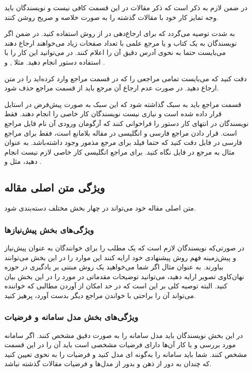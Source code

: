 \documentclass{CCI2020}
\begin{document}
در ضمن لازم به ذکر است که ذکر مقالات در این قسمت کافی نیست و نویسندگان باید وجه تمایز کار خود با مقالات گذشته را به صورت خلاصه و صریح روشن کنند. 

به شدت توصیه می‌گردد که برای ارجاع‌دهی در 
\lr{\LaTeX} 
از روش
استفاده کنید. در ضمن اگر نویسندگان به یک کتاب و یا مرجع علمی با تعداد صفحات زیاد می‌خواهند ارجاع دهند می‌بایست حتما به نحوی آدرس دقیق آن را اعلام کنند. در
\lr{\LaTeX}
می‌توانید این کار را با استفاده دستور
انجام دهید. مثلا
\cite[قضیه 2-1]{cover2006elements}, \cite[بخش ۳-۳]{Boyd2004Convex} و \cite[صفحه ۴۵]{Durrett2012Essentials}.

دقت کنید که می‌بایست تمامی مراجعی را که در قسمت مراجع وارد کرده‌اید را در متن ارجاع دهید. در صورت عدم ارجاع آن مرجع باید از قسمت مراجع حذف شود. 

قسمت مراجع باید به سبک
 گذاشته شود که این سبک به صورت پیش‌فرض در استایل قرار داده شده است و نیازی نیست نویسندگان کار خاصی را انجام دهند. فقط نویسندگان در انتهای کار دستور 
  را فراخوانی کنند که آرگومان ورودی آن نام فایل 
   مراجع است. قرار دادن مراجع فارسی و انگلیسی در مقاله بلامانع است، فقط برای مراجع فارسی در فایل
     دقت کنید که حتما فیلد 
     برای مرجع مذمور وجود داشته‌باشد. به عنوان مثال به مرجع
\cite{diyanat1389}
در فایل 
نگاه کنید. برای مراجع انگلیسی کار خاصی لازم نیست انجام دهید، مثل
\cite{Yang2010Modeling} و \cite{Beran1995Long}.



\subsection{ویژگی متن اصلی مقاله}
متن اصلی مقاله خود می‌تواند در چهار بخش مختلف دسته‌بندی شود. 
\subsubsection{ویژگی‌های بخش پیش‌نیازها}
در صورتی‌که نویسندگان لازم است که یک مطلب را برای خوانندگان به عنوان پیش‌نیاز و پیش‌زمینه فهم روش پیشنهادی خود ارایه کنند این موارد را در این بخش می‌توانند بیاورند. به عنوان مثال اگر شما می‌خواهید یک روش مبتنی بر یادگیری  در حوزه نهان‌کاوی تصویر ارایه دهید، می‌توانید توضیحات مقدماتی در مورد  را در این بخش بیان کنید. البته توصیه کلی بر این است که در حد امکان از آوردن مطالبی که خواننده می‌تواند آن را براحتی با خواندن مراجع دیگر بدست آورد، پرهیز کنید.
\subsubsection{ویژگی‌های بخش مدل سامانه و فرضیات}
در این بخش نویسندگان باید مدل سامانه را به صورت دقیق مشخص کنند. اگر سامانه مورد بررسی و یا کار آن‌ها دارای فرضیات مشخصی است باید آن را در این قسمت مشخص کنند. شما باید سامانه را به‌گونه ای مدل کنید و فرضیات را به نحوی تعیین کنید که چندان به دور از ذهن و بدور از مدل‌ها و فرضیات مقالات گذشته نباشد.
\end{document}
